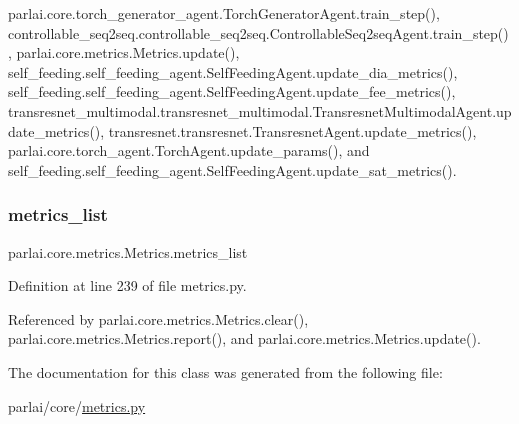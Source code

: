 parlai.\+core.\+torch\+\_\+generator\+\_\+agent.\+Torch\+Generator\+Agent.\+train\+\_\+step(), controllable\+\_\+seq2seq.\+controllable\+\_\+seq2seq.\+Controllable\+Seq2seq\+Agent.\+train\+\_\+step(), parlai.\+core.\+metrics.\+Metrics.\+update(), self\+\_\+feeding.\+self\+\_\+feeding\+\_\+agent.\+Self\+Feeding\+Agent.\+update\+\_\+dia\+\_\+metrics(), self\+\_\+feeding.\+self\+\_\+feeding\+\_\+agent.\+Self\+Feeding\+Agent.\+update\+\_\+fee\+\_\+metrics(), transresnet\+\_\+multimodal.\+transresnet\+\_\+multimodal.\+Transresnet\+Multimodal\+Agent.\+update\+\_\+metrics(), transresnet.\+transresnet.\+Transresnet\+Agent.\+update\+\_\+metrics(), parlai.\+core.\+torch\+\_\+agent.\+Torch\+Agent.\+update\+\_\+params(), and self\+\_\+feeding.\+self\+\_\+feeding\+\_\+agent.\+Self\+Feeding\+Agent.\+update\+\_\+sat\+\_\+metrics().

\mbox{\label{classparlai_1_1core_1_1metrics_1_1Metrics_ae0d3620f86dd5cd08e4d1c097ac6dde4}} 
\subsubsection{\texorpdfstring{metrics\+\_\+list}{metrics\_list}}
{\footnotesize\ttfamily parlai.\+core.\+metrics.\+Metrics.\+metrics\+\_\+list}



Definition at line 239 of file metrics.\+py.



Referenced by parlai.\+core.\+metrics.\+Metrics.\+clear(), parlai.\+core.\+metrics.\+Metrics.\+report(), and parlai.\+core.\+metrics.\+Metrics.\+update().



The documentation for this class was generated from the following file\+:\begin{DoxyCompactItemize}
\item 
parlai/core/\hyperlink{metrics_8py}{metrics.\+py}\end{DoxyCompactItemize}

